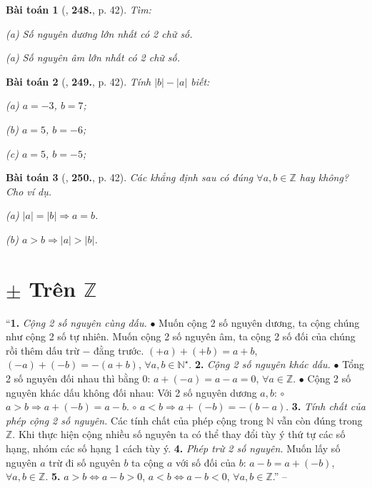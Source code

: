 \documentclass{article}
\numberwithin{equation}{section}
\newtheorem{baitoan}{Bài toán}
\begin{document}
\begin{baitoan}[\cite{Binh_Toan_6_tap_1}, \textbf{248.}, p. 42]
	Tìm:
	\begin{enumerate*}
		\item[(a)] Số nguyên dương lớn nhất có 2 chữ số.
		\item[(a)] Số nguyên âm lớn nhất có 2 chữ số.
	\end{enumerate*}
\end{baitoan}

\begin{baitoan}[\cite{Binh_Toan_6_tap_1}, \textbf{249.}, p. 42]
	Tính $|b| - |a|$ biết: 
	\begin{enumerate*}
		\item[(a)] $a = -3$, $b = 7$;
		\item[(b)] $a = 5$, $b = -6$;
		\item[(c)] $a = 5$, $b = -5$;
	\end{enumerate*}
\end{baitoan}

\begin{baitoan}[\cite{Binh_Toan_6_tap_1}, \textbf{250.}, p. 42]
	Các khẳng định sau có đúng $\forall a,b\in\mathbb{Z}$ hay không? Cho ví dụ.
	\begin{enumerate*}
		\item[(a)] $|a| = |b|\Rightarrow a = b$.
		\item[(b)] $a > b\Rightarrow|a| > |b|$.
	\end{enumerate*}
\end{baitoan}


\section{$\pm$ Trên $\mathbb{Z}$}
``\textbf{1.} \textit{Cộng 2 số nguyên cùng dấu.} $\bullet$ Muốn cộng 2 số nguyên dương, ta cộng chúng như cộng 2 số tự nhiên. Muốn cộng 2 số nguyên âm, ta cộng 2 số đối của chúng rồi thêm dấu trừ $-$ đằng trước. $(+a) + (+b) = a + b$, $(-a) + (-b) = -(a + b)$, $\forall a,b\in\mathbb{N}^\star$. \textbf{2.} \textit{Cộng 2 số nguyên khác dấu.} $\bullet$ Tổng 2 số nguyên đối nhau thì bằng $0$: $a + (-a) = a - a = 0$, $\forall a\in\mathbb{Z}$. $\bullet$ Cộng 2 số nguyên khác dấu không đối nhau: Với 2 số nguyên dương $a,b$: $\circ$ $a > b\Rightarrow a + (-b) = a - b$. $\circ$ $a < b\Rightarrow a + (-b) = -(b - a)$. \textbf{3.} \textit{Tính chất của phép cộng 2 số nguyên.} Các tính chất của phép cộng trong $\mathbb{N}$ vẫn còn đúng trong $\mathbb{Z}$. Khi thực hiện cộng nhiều số nguyên ta có thể thay đổi tùy ý thứ tự các số hạng, nhóm các số hạng 1 cách tùy ý. \textbf{4.} \textit{Phép trừ 2 số nguyên.} Muốn lấy số nguyên $a$ trừ đi số nguyên $b$ ta cộng $a$ với số đối của $b$: $a - b = a + (-b)$, $\forall a,b\in\mathbb{Z}$. \textbf{5.} $a > b\Leftrightarrow a - b > 0$, $a < b\Leftrightarrow a - b < 0$, $\forall a,b\in\mathbb{Z}$.'' -- \cite[Chap. II, \S2, p. 37]{Tuyen_Toan_6}
\end{document}
